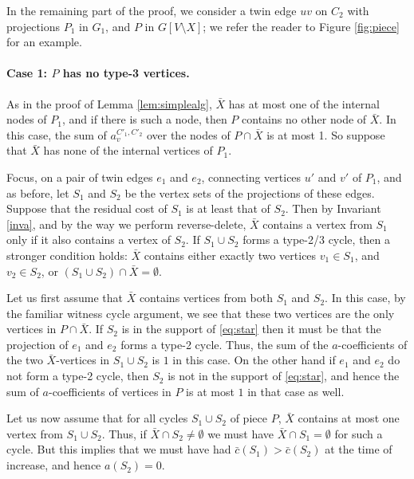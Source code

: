\documentclass{article}
\newcommand{\0}{\mathbb{0}}
\newcommand{\1}{\mathbb{1}}
\begin{document}
In the remaining part of the proof, we consider a twin edge $uv$ on $C_2$ with
projections $P_1$ in $G_1$, and $P$ in $G[V\setminus X]$; we refer the reader
to Figure \ref{fig:piece} for an example.

\paragraph{Case 1: $P$ has no type-3 vertices.}

As in the proof of Lemma
\ref{lem:simplealg}, $\bar{X}$ has at most one of the internal nodes of $P_1$, and if
there is such a node, then $P$ contains no other node of $\bar{X}$. In this case, 
the sum of $a^{C'_1,C'_2}_v$ over the nodes of $P \cap \bar{X}$ is at most 1.
So suppose that $\bar{X}$ has none of the internal vertices of $P_1$. 

Focus, on a pair of twin edges $e_1$ and $e_2$, connecting vertices $u'$ and
$v'$ of $P_1$, and as before, let $S_1$ and $S_2$ be the vertex sets of the
projections of these edges.  Suppose that the residual cost of $S_1$ is at
least that of $S_2$. Then by Invariant \ref{inva}, and by the way we perform
reverse-delete, $\bar{X}$ contains a vertex from $S_1$
only if it also contains a vertex of $S_2$. If $S_1 \cup S_2$ forms a type-2/3 cycle, then
a stronger condition holds: $\bar{X}$ contains either exactly two vertices $v_1 \in S_1$,
and $v_2 \in S_2$, or $(S_1 \cup S_2)\cap \bar{X}=\emptyset$. 

Let us first assume that $\bar{X}$ contains
vertices from both $S_1$ and $S_2$. In this case, by the familiar witness cycle
argument, we see that these two vertices are the only vertices in $P \cap
\bar{X}$. If $S_2$ is in the support of \eqref{eq:star} then it must be that
the projection of $e_1$ and $e_2$ forms a type-2 cycle. Thus, the sum of the
$a$-coefficients of the two $\bar{X}$-vertices in $S_1 \cup S_2$ is $1$ in
this case. On the other hand if $e_1$ and $e_2$ do not form a type-2 cycle,
then $S_2$ is not in the support of \eqref{eq:star}, and hence the sum of
$a$-coefficients of vertices in $P$ is at most $1$ in that case as well. 

Let us now assume that for all cycles $S_1 \cup S_2$ of piece $P$, $\bar{X}$
contains at most one vertex from $S_1 \cup S_2$. Thus, if $\bar{X} \cap S_2
\neq \emptyset$ we must have $\bar{X}\cap S_1=\emptyset$ for such a cycle. But
this implies that we must have had $\bar{c} (S_1)>\bar{c}(S_2)$ at the time of
increase, and hence $a(S_2)=0$. 
\end{document}

